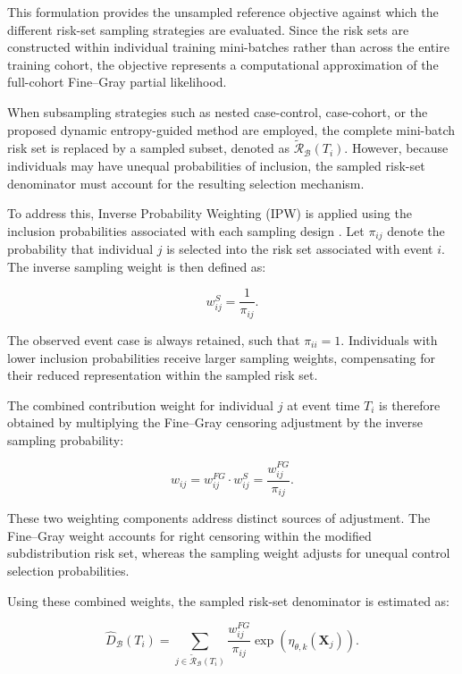 \documentclass[a4paper,twoside,12pt]{report}
\begin{document}
This formulation provides the unsampled reference objective against which the different risk-set sampling strategies are evaluated. Since the risk sets are constructed within individual training mini-batches rather than across the entire training cohort, the objective represents a computational approximation of the full-cohort Fine--Gray partial likelihood.

When subsampling strategies such as nested case-control, case-cohort, or the proposed dynamic entropy-guided method are employed, the complete mini-batch risk set is replaced by a sampled subset, denoted as $\widetilde{\mathcal{R}}_{\mathcal{B}}(T_i)$. However, because individuals may have unequal probabilities of inclusion, the sampled risk-set denominator must account for the resulting selection mechanism.

To address this, Inverse Probability Weighting (IPW) is applied using the inclusion probabilities associated with each sampling design \citep{HorvitzThompson1952, Prentice1986}. Let $\pi_{ij}$ denote the probability that individual $j$ is selected into the risk set associated with event $i$. The inverse sampling weight is then defined as:

\begin{equation}
w_{ij}^{S}
=
\frac{1}{\pi_{ij}}.
\end{equation}

The observed event case is always retained, such that $\pi_{ii}=1$. Individuals with lower inclusion probabilities receive larger sampling weights, compensating for their reduced representation within the sampled risk set.

The combined contribution weight for individual $j$ at event time $T_i$ is therefore obtained by multiplying the Fine--Gray censoring adjustment by the inverse sampling probability:

\begin{equation}
w_{ij}
=
w_{ij}^{FG} \cdot w_{ij}^{S}
=
\frac{w_{ij}^{FG}}{\pi_{ij}}.
\end{equation}

These two weighting components address distinct sources of adjustment. The Fine--Gray weight accounts for right censoring within the modified subdistribution risk set, whereas the sampling weight adjusts for unequal control selection probabilities.

Using these combined weights, the sampled risk-set denominator is estimated as:

\begin{equation}
\widehat{D}_{\mathcal{B}}(T_i)
=
\sum_{j \in \widetilde{\mathcal{R}}_{\mathcal{B}}(T_i)}
\frac{w_{ij}^{FG}}{\pi_{ij}}
\exp\left(\eta_{\theta,k}(\boldsymbol{X}_j)\right).
\end{equation}
\end{document}
